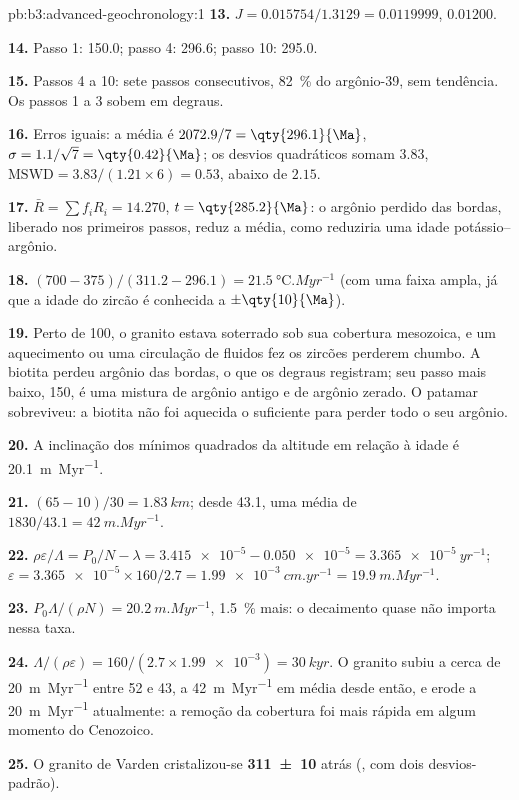 \begin{solution}{pb:b3:advanced-geochronology:1}
\textbf{13.} $J = 0.015754/1.3129 = 0.0119999$, $0.01200$.

\textbf{14.} Passo 1: \qty{150.0}{\Ma}; passo 4: \qty{296.6}{\Ma}; passo 10:
\qty{295.0}{\Ma}.

\textbf{15.} Passos 4 a 10: sete passos consecutivos, \qty{82}{\percent} do
argônio-39, sem tendência. Os passos 1 a 3 sobem em degraus.

\textbf{16.} Erros iguais: a média é $2072.9/7 = \qty{296.1}{\Ma}$, $\sigma =
1.1/\sqrt7 = \qty{0.42}{\Ma}$; os desvios quadráticos somam $3.83$,
$\mathrm{MSWD} = 3.83/(1.21\times6) = 0.53$, abaixo de $2.15$.

\textbf{17.} $\bar R = \sum f_iR_i = 14.270$, $t = \qty{285.2}{\Ma}$: o
argônio perdido das bordas, liberado nos primeiros passos, reduz a média, como
reduziria uma idade potássio--argônio.

\textbf{18.} $(700 - 375)/(311.2 - 296.1) = \qty{21.5}{\celsius.Myr^{-1}}$
(com uma faixa ampla, já que a idade do zircão é conhecida a $\pm\qty{10}{\Ma}$).

\textbf{19.} Perto de \qty{100}{\Ma}, o granito estava soterrado sob sua
cobertura mesozoica, e um aquecimento ou uma circulação de fluidos fez os zircões perderem chumbo.
A biotita perdeu argônio das bordas, o que os degraus registram; seu
passo mais baixo, \qty{150}{\Ma}, é uma mistura de argônio antigo e de argônio zerado. O patamar
sobreviveu: a biotita não foi aquecida o suficiente para perder todo o seu argônio.

\textbf{20.} A inclinação dos mínimos quadrados da altitude em relação à idade é
\qty{20.1}{m.Myr^{-1}}.

\textbf{21.} $(65 - 10)/30 = \qty{1.83}{km}$; desde \qty{43.1}{\Ma}, uma média de
$1830/43.1 = \qty{42}{m.Myr^{-1}}$.

\textbf{22.} $\rho\varepsilon/\Lambda = P_0/N - \lambda = \num{3.415e-5} -
\num{0.050e-5} = \qty{3.365e-5}{yr^{-1}}$; $\varepsilon = \num{3.365e-5}\times
160/2.7 = \qty{1.99e-3}{cm.yr^{-1}} = \qty{19.9}{m.Myr^{-1}}$.

\textbf{23.} $P_0\Lambda/(\rho N) = \qty{20.2}{m.Myr^{-1}}$, \qty{1.5}{\percent}
mais: o decaimento quase não importa nessa taxa.

\textbf{24.} $\Lambda/(\rho\varepsilon) = 160/(2.7\times\num{1.99e-3}) =
\qty{30}{kyr}$. O granito subiu a cerca de \qty{20}{m.Myr^{-1}} entre 52 e
\qty{43}{\Ma}, a \qty{42}{m.Myr^{-1}} em média desde então, e erode a
\qty{20}{m.Myr^{-1}} atualmente: a remoção da cobertura foi mais rápida em algum momento do
Cenozoico.

\textbf{25.} O granito de Varden cristalizou-se
\textbf{\qty[text-series-to-math=true, separate-uncertainty=true]{311 \pm 10}{\Ma}} atrás (,
com dois desvios-padrão).
\end{solution}
